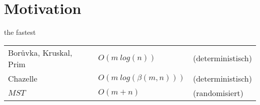 \section{Motivation}
\begin{frame}{\glqq the fastest\grqq}
    \begin{overlayarea}{\textwidth}{4cm}
        \begin{tabular}{lll}
            Bor\r uvka, Kruskal, Prim&  $O(m\ log(n))$ &(deterministisch)\\
            Chazelle                 &  $O(m\ log(\beta(m,n)))$ &(deterministisch)\\
            $MST$                    &  $O(m+n)$             &(randomisiert)\\
        \end{tabular}\\
        \gap
    \end{overlayarea}
\end{frame}


